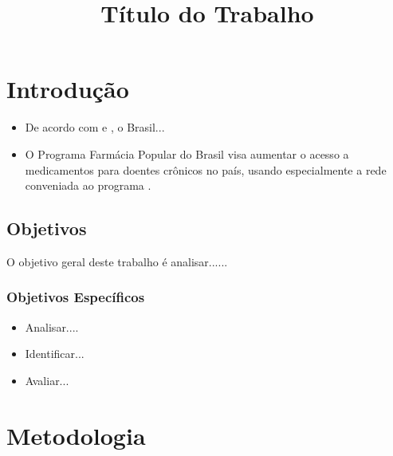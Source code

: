 

\title{Título do Trabalho}

\def\autorA{Nome do Aluno 1\\
\texttt{meu.email@academico.ufpb.br}}

\def\autorB{Nome do Aluno 2\\
\texttt{meu.email@academico.ufpb.br}}

\def\disciplina{Técnicas de Pesquisa e Análise de Dados I}
\def\professor{Aléssio Tony C. Almeida}





\chapter{Introdução}

\lipsum[1-1]
	
	
	\begin{itemize}
		\item De acordo com \cite{Almeida2019} e \cite{Silva2019}, o Brasil...
		\item O Programa Farmácia Popular do Brasil visa aumentar o acesso a medicamentos para doentes crônicos no país, usando especialmente a rede conveniada ao programa \citep{Almeida2019}.
	\end{itemize}
	
\lipsum[1-5]

\section{Objetivos}
O objetivo geral deste trabalho é analisar......

\subsection{Objetivos Específicos}

\begin{itemize}
    \item Analisar....
    \item Identificar...
    \item Avaliar...
\end{itemize}

\chapter{Metodologia}

